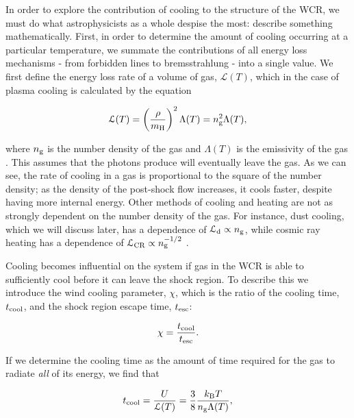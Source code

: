 In order to explore the contribution of cooling to the structure of the WCR, we must do what astrophysicists as a whole despise the most: describe something mathematically.
First, in order to determine the amount of cooling occurring at a particular temperature, we summate the contributions of all energy loss mechanisms - from forbidden lines to bremsstrahlung - into a single value.
We first define the energy loss rate of a volume of gas, $\mathcal{L}(T)$, which in the case of plasma cooling is calculated by the equation

\begin{equation}
  \label{eq:energylossrate}
  \mathcal{L}(T) = \left(\frac{\rho}{m_\text{H}}\right)^2 \Lambda(T) = n_\text{g}^2 \Lambda(T) , 
\end{equation}

\noindent
where $n_\text{g}$ is the number density of the gas and $\Lambda(T)$ is the emissivity of the gas \parencite{stevens_colliding_1992}.
This assumes that the photons produce will eventually leave the gas.
As we can see, the rate of cooling in a gas is proportional to the square of the number density; as the density of the post-shock flow increases, it cools faster, despite having more internal energy.
Other methods of cooling and heating are not as strongly dependent on the number density of the gas.
For instance, dust cooling, which we will discuss later, has a dependence of $\mathcal{L}_\text{d} \propto n_\text{g}$, while cosmic ray heating has a dependence of $\mathcal{L}_\text{CR} \propto n_\text{g}^{-1/2}$ \parencite{wienerCosmicRayHeating2013}.

Cooling becomes influential on the system if gas in the WCR is able to sufficiently cool before it can leave the shock region.
To describe this we introduce the wind cooling parameter, $\chi$, which is the ratio of the cooling time, $t_\text{cool}$, and the shock region escape time, $t_\text{esc}$:

\begin{equation}
  \chi = \frac{t_\text{cool}}{t_\text{esc}}.
\end{equation}

\noindent
If we determine the cooling time as the amount of time required for the gas to radiate \emph{all} of its energy, we find that

\begin{equation}
  \label{eq:taucool}
  t_\text{cool} = \frac{U}{\mathcal{L}(T)} = \frac{3}{8} \frac{k_\text{B} T}{n_\text{g} \Lambda(T)},
\end{equation}

